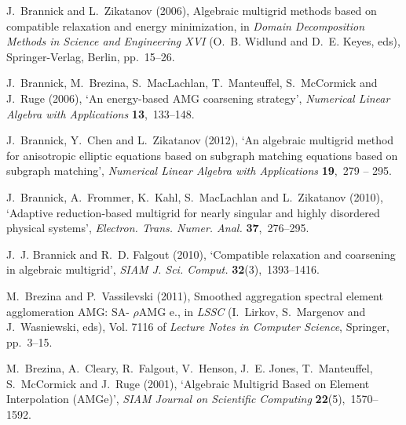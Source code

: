 \documentclass[12pt]{acta_2011xz}
\begin{document}
\begin{thebibliography}{xx}
J.~Brannick and L.~Zikatanov  (2006), Algebraic multigrid methods based on
  compatible relaxation and energy minimization, in {\em Domain Decomposition
  Methods in Science and Engineering XVI} (O.~B. Widlund and D.~E. Keyes, eds),
  Springer-Verlag, Berlin, pp.~15--26.

J.~Brannick, M.~Brezina, S.~MacLachlan, T.~Manteuffel, S.~McCormick and J.~Ruge
   (2006), `An energy-based {AMG} coarsening strategy', {\em Numerical Linear
  Algebra with Applications} {\bf 13},~133--148.

J.~Brannick, Y.~Chen and L.~Zikatanov  (2012), `An algebraic multigrid method
  for anisotropic elliptic equations based on subgraph matching equations based
  on subgraph matching', {\em Numerical Linear Algebra with Applications} {\bf
  19},~279 -- 295.

J.~Brannick, A.~Frommer, K.~Kahl, S.~MacLachlan and L.~Zikatanov  (2010),
  `Adaptive reduction-based multigrid for nearly singular and highly disordered
  physical systems', {\em Electron. Trans. Numer. Anal.} {\bf 37},~276--295.

J.~J. Brannick and R.~D. Falgout  (2010), `Compatible relaxation and coarsening
  in algebraic multigrid', {\em SIAM J. Sci. Comput.} {\bf 32}(3),~1393--1416.

M.~Brezina and P.~Vassilevski  (2011), Smoothed aggregation spectral element
  agglomeration {AMG: SA-        $\rho\text{AMG}$        e.}, in {\em LSSC} (I.~Lirkov,
  S.~Margenov and J.~Wasniewski, eds), Vol. 7116 of {\em Lecture Notes in
  Computer Science}, Springer, pp.~3--15.

M.~Brezina, A.~Cleary, R.~Falgout, V.~Henson, J.~E. Jones, T.~Manteuffel,
  S.~McCormick and J.~Ruge  (2001), `{Algebraic Multigrid Based on Element
  Interpolation (AMGe)}', {\em SIAM Journal on Scientific Computing} {\bf
  22}(5),~1570--1592.


\end{thebibliography}
\end{document}
